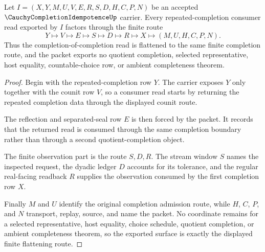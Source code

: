\begin{theorem}
\label{thm:cauchy-completion-idempotence-flattening-surface}
Let $I=(X,Y,M,U,V,E,R,S,D,H,C,P,N)$ be an accepted $\CauchyCompletionIdempotenceUp$ carrier. Every repeated-completion consumer read exported by $I$ factors through the finite route
$$
Y\longmapsto V\longmapsto E\longmapsto S\longmapsto D\longmapsto R\longmapsto X\longmapsto(M,U,H,C,P,N).
$$
Thus the completion-of-completion read is flattened to the same finite completion route, and the packet exports no quotient completion, selected representative, host equality, countable-choice row, or ambient completeness theorem.
\end{theorem}
\begin{proof}
Begin with the repeated-completion row $Y$. The carrier exposes $Y$ only together with the counit row $V$, so a consumer read starts by returning the repeated completion data through the displayed counit route.

The reflection and separated-seal row $E$ is then forced by the packet. It records that the returned read is consumed through the same completion boundary rather than through a second quotient-completion object.

The finite observation part is the route $S,D,R$. The stream window $S$ names the inspected request, the dyadic ledger $D$ accounts for its tolerance, and the regular real-facing readback $R$ supplies the observation consumed by the first completion row $X$.

Finally $M$ and $U$ identify the original completion admission route, while $H$, $C$, $P$, and $N$ transport, replay, source, and name the packet. No coordinate remains for a selected representative, host equality, choice schedule, quotient completion, or ambient completeness theorem, so the exported surface is exactly the displayed finite flattening route.
\end{proof}

\begin{closurestatus}{\CauchyCompletionIdempotenceUp}
  \theoryclosure{\seedClosure}
  \formalstatus{\unformalizedV}
\end{closurestatus}
